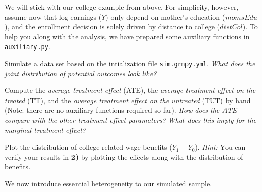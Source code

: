    \vspace{0.5cm}

   We will stick with our college example from above. For simplicity, however, assume now that log earnings ($Y$) only depend on mother's education ($momsEdu$), and the enrollment decision is solely driven by distance to college ($distCol$). To help you along with the analysis, we have prepared some auxiliary functions in  \href{https://github.com/HumanCapitalAnalysis/microeconometrics/blob/master/problem-sets/04-generalized-roy-model/sources/auxiliary.py}{\texttt{auxiliary.py}}.


\begin{boenumerate}
  \item Simulate a data set based on the intialization file \href{https://github.com/HumanCapitalAnalysis/microeconometrics/blob/master/problem-sets/04-generalized-roy-model/sources/sim.grmpy.yml}{\texttt{sim.grmpy.yml}}. 
  \textit{What does the joint distribution of potential outcomes look like?}
  
  \item Compute the \emph{average treatment effect} (ATE), the \emph{average treatment effect on the treated} (TT), and the \emph{average treatment effect on the untreated} (TUT) by hand (Note: there are no auxiliary functions required so far). \emph{How does the ATE compare with the other treatment effect parameters?} \emph{What does this imply for the marginal treatment effect?}
  
  \item Plot the distribution of college-related wage benefits ($Y_1 - Y_0$). \textit{Hint:} You can verify your results in \textbf{2)} by plotting the effects along with the distribution of benefits.
  
\end{boenumerate}

  \noindent We now introduce essential heterogeneity to our simulated sample.

